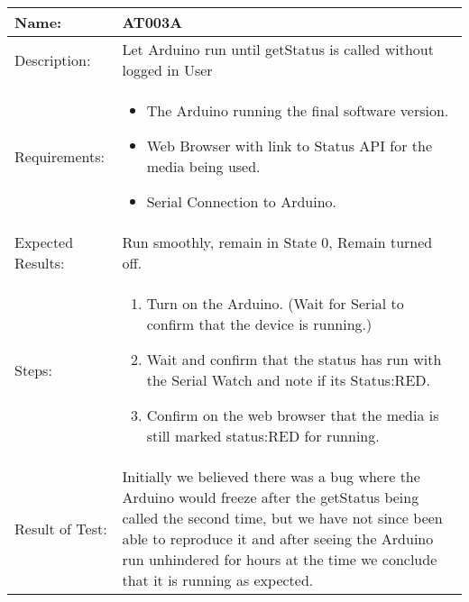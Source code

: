 \begin{table}[h]
	\centering
		\begin{tabular}{|l|p{9cm}|}
		\hline
		\hline
		Name: & AT003A\\
		\hline
		Description: & Let Arduino run until getStatus is called without logged in User\\
		\hline
		Requirements: & 
		\begin{itemize}
			\item The Arduino running the final software version.
			\item Web Browser with link to Status API for the media being used.
			\item Serial Connection to Arduino.
		\end{itemize}
		\\
		\hline
		Expected Results: & Run smoothly, remain in State 0, Remain turned off.\\
		\hline
		Steps: & 
		\begin{enumerate}
			\item Turn on the Arduino. (Wait for Serial to confirm that the device is running.)
			\item Wait and confirm that the status has run with the Serial Watch and note if its Status:RED.
			\item Confirm on the web browser that the media is still marked status:RED for running.
		\end{enumerate}
		\\
		\hline
		Result of Test: & Initially we believed there was a bug where the Arduino would freeze after the getStatus being called the second time, but we have not since been able to reproduce it and after seeing the Arduino run unhindered for hours at the time we conclude that it is running as expected.\\
		\hline
		\end{tabular}
\end{table}

